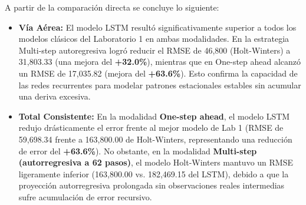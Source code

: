 \documentclass[11pt, a4paper]{article}
\begin{document}
\begin{table}[H]
\centering
\caption{Comparación cuantitativa de desempeño en el conjunto de prueba (62 meses): Modelos Clásicos del Laboratorio 1 (SARIMA y Holt-Winters) vs. Modelos LSTM del Laboratorio 2 (Multi-step y One-step ahead).}
\label{tab:comparacion_lab1_vs_lab2}
\end{table}

A partir de la comparación directa se concluye lo siguiente:
\begin{itemize}
    \item \textbf{Vía Aérea:} El modelo LSTM resultó significativamente superior a todos los modelos clásicos del Laboratorio 1 en ambas modalidades. En la estrategia Multi-step autoregresiva logró reducir el RMSE de 46,800 (Holt-Winters) a 31,803.33 (una mejora del \textbf{+32.0\%}), mientras que en One-step ahead alcanzó un RMSE de 17,035.82 (mejora del \textbf{+63.6\%}). Esto confirma la capacidad de las redes recurrentes para modelar patrones estacionales estables sin acumular una deriva excesiva.
    \item \textbf{Total Consistente:} En la modalidad \textbf{One-step ahead}, el modelo LSTM redujo drásticamente el error frente al mejor modelo de Lab 1 (RMSE de 59,698.34 frente a 163,800.00 de Holt-Winters, representando una reducción de error del \textbf{+63.6\%}). No obstante, en la modalidad \textbf{Multi-step (autorregresiva a 62 pasos)}, el modelo Holt-Winters mantuvo un RMSE ligeramente inferior (163,800.00 vs. 182,469.15 del LSTM), debido a que la proyección autorregresiva prolongada sin observaciones reales intermedias sufre acumulación de error recursivo.
\end{itemize}
\end{document}
